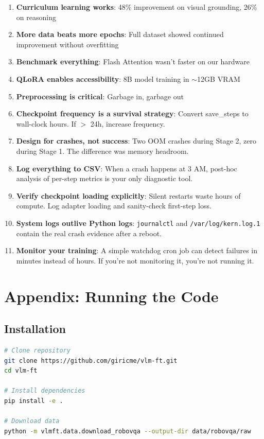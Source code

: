 \documentclass[11pt,a4paper]{article}
\begin{document}
\begin{enumerate}
    \item \textbf{Curriculum learning works}: 48\% improvement on visual grounding, 26\% on reasoning
    \item \textbf{More data beats more epochs}: Full dataset showed continued improvement without overfitting
    \item \textbf{Benchmark everything}: Flash Attention wasn't faster on our hardware
    \item \textbf{QLoRA enables accessibility}: 8B model training in $\sim$12GB VRAM
    \item \textbf{Preprocessing is critical}: Garbage in, garbage out
    \item \textbf{Checkpoint frequency is a survival strategy}: Convert save\_steps to wall-clock hours. If $>$ 24h, increase frequency.
    \item \textbf{Design for crashes, not success}: Two OOM crashes during Stage 2, zero during Stage 1. The difference was memory headroom.
    \item \textbf{Log everything to CSV}: When a crash happens at 3 AM, post-hoc analysis of per-step metrics is your only diagnostic tool.
    \item \textbf{Verify checkpoint loading explicitly}: Silent restarts waste hours of compute. Log adapter loading and sanity-check first-step loss.
    \item \textbf{System logs outlive Python logs}: \texttt{journalctl} and \texttt{/var/log/kern.log.1} contain the real crash evidence after a reboot.
    \item \textbf{Monitor your training}: A simple watchdog cron job can detect failures in minutes instead of hours. If you're not monitoring it, you're not running it.
\end{enumerate}

\section{Appendix: Running the Code}

\subsection{Installation}

\begin{lstlisting}[language=bash,caption=Installation commands]
# Clone repository
git clone https://github.com/giricme/vlm-ft.git
cd vlm-ft

# Install dependencies
pip install -e .

# Download data
python -m vlmft.data.download_robovqa --output-dir data/robovqa/raw
\end{lstlisting}
\end{document}
